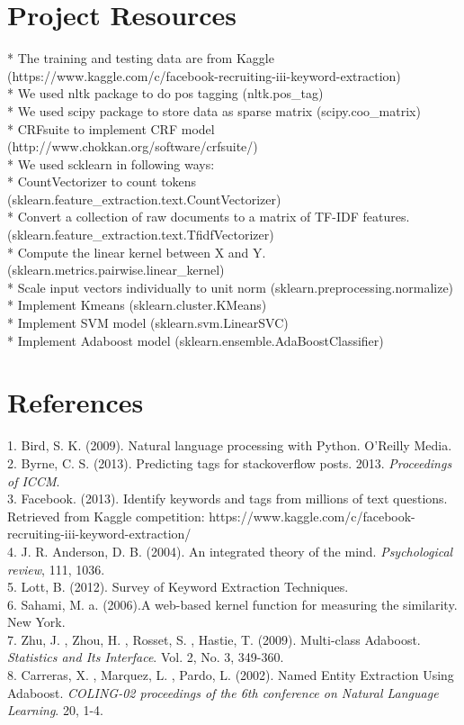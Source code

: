 \documentclass[paper=a4, fontsize=11pt]{scrartcl} %
\numberwithin{equation}{section} %
\numberwithin{figure}{section} %
\numberwithin{table}{section} %
\begin{document}
\section{Project Resources}
* The training and testing data are from Kaggle (https://www.kaggle.com/c/facebook-recruiting-iii-keyword-extraction) \\
* We used nltk package to do pos tagging (nltk.pos\_tag) \\
* We used scipy package to store data as sparse matrix (scipy.coo\_matrix)\\
* CRFsuite to implement CRF model (http://www.chokkan.org/software/crfsuite/)\\
* We used scklearn in following ways: \\
* CountVectorizer to count tokens (sklearn.feature\_extraction.text.CountVectorizer)\\
* Convert a collection of raw documents to a matrix of TF-IDF features. \\ (sklearn.feature\_extraction.text.TfidfVectorizer) \\
* Compute the linear kernel between X and Y. (sklearn.metrics.pairwise.linear\_kernel) \\
* Scale input vectors individually to unit norm (sklearn.preprocessing.normalize) \\
* Implement Kmeans (sklearn.cluster.KMeans)\\
* Implement SVM model (sklearn.svm.LinearSVC) \\
* Implement Adaboost model (sklearn.ensemble.AdaBoostClassifier)

\section{References}
1. Bird, S. K. (2009). Natural language processing with Python. O'Reilly Media. \\
2. Byrne, C. S. (2013). Predicting tags for stackoverflow posts. 2013. \emph{Proceedings of ICCM}. \\
3. Facebook. (2013). Identify keywords and tags from millions of text questions. Retrieved from Kaggle competition: https://www.kaggle.com/c/facebook-recruiting-iii-keyword-extraction/\\
4. J. R. Anderson, D. B. (2004). An integrated theory of the mind. \emph{Psychological review}, 111, 1036.\\
5. Lott, B. (2012). Survey of Keyword Extraction Techniques. \\
6. Sahami, M. a. (2006).A web-based kernel function for measuring the similarity. New York.\\
7. Zhu, J.  , Zhou, H.  , Rosset, S. , Hastie, T. (2009). Multi-class Adaboost. \emph{Statistics and Its Interface}. Vol. 2, No. 3, 349-360. \\
8. Carreras, X. , Marquez, L. , Pardo, L. (2002). Named Entity Extraction Using Adaboost. \emph{COLING-02 proceedings of the 6th conference on Natural Language Learning}. 20, 1-4.
\end{document}
